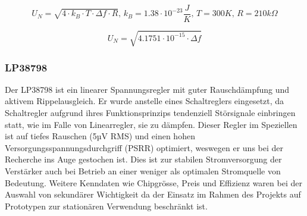 \begin{equation}
    U_N = \sqrt{4 \cdot k_B \cdot T \cdot \Delta f \cdot R},\,k_B = 1.38\cdot 10^{-23}\frac{J}{K},\,T = 300K,\,R = 210k\Omega
\label{eq:DAC_rauschen}
\end{equation}

\begin{equation}
    U_N = \sqrt{4.1751\cdot 10^{-15} \cdot \Delta f}
\label{eq:DAC_rauschen2}
\end{equation}

\subsubsection{LP38798}
Der LP38798 ist ein linearer Spannungsregler mit guter Rauschdämpfung und aktivem Rippelausgleich. Er wurde anstelle eines Schaltreglers eingesetzt, da Schaltregler aufgrund ihres Funktionsprinzips tendenziell Störsignale einbringen statt, wie im Falle von Linearregler, sie zu dämpfen.
Dieser Regler im Speziellen ist auf tiefes Rauschen (5µV RMS) und einen hohen Versorgungsspannungsdurchgriff (PSRR) optimiert, weswegen er uns bei der Recherche ins Auge gestochen ist. Dies ist zur stabilen Stromversorgung der Verstärker auch bei Betrieb an einer weniger als optimalen Stromquelle von Bedeutung.
Weitere Kenndaten wie Chipgrösse, Preis und Effizienz waren bei der Auswahl von sekundärer Wichtigkeit da der Einsatz im Rahmen des Projekts auf Prototypen zur stationären Verwendung beschränkt ist.

